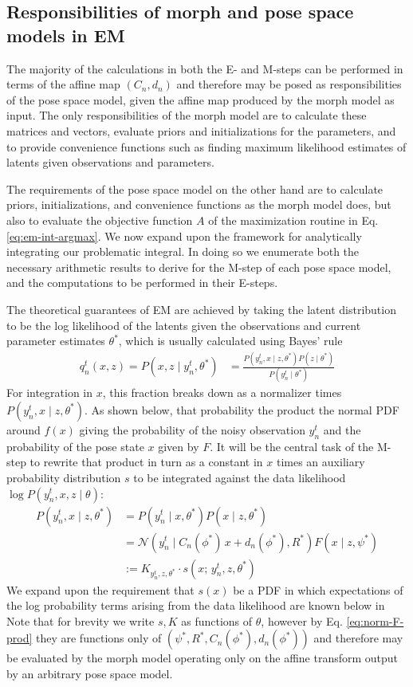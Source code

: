 \documentclass{article}         %
\newcommand{\NN}{\mathcal{N}}
\begin{document}
\subsection{Responsibilities of morph and pose space models in EM}

The majority of the calculations in both the E- and M-steps can be performed in terms of the affine map $(C_n, d_n)$ and therefore may be posed as responsibilities of the pose space model, given the affine map produced by the morph model as input. The only responsibilities of the morph model are to calculate these matrices and vectors, evaluate priors and initializations for the parameters, and to provide convenience functions such as finding maximum likelihood estimates of latents given observations and parameters.

The requirements of the pose space model on the other hand are to calculate priors, initializations, and convenience functions as the morph model does, but also to evaluate the objective function $A$ of the maximization routine in Eq. \ref{eq:em-int-argmax}. We now expand upon the framework for analytically integrating our problematic integral. In doing so we enumerate both the necessary arithmetic results to derive for the M-step of each pose space model, and the computations to be performed in their E-steps.

The theoretical guarantees of EM are achieved by taking the latent distribution to be the log likelihood of the latents given the observations and current parameter estimates $\theta^*$, which is usually calculated using Bayes' rule
\begin{align}
    q_n^t(x, z) = P(x, z \mid y_n^t, \theta^*) &= \frac{P(y_n^t, x \mid z, \theta^*) P(z\mid \theta^*)}{P(y_n^t \mid \theta^*)}
    \label{eq:q-general}
\end{align}
For integration in $x$, this fraction breaks down as a normalizer times $P(y_n^t, x \mid z, \theta^*)$. As shown below, that probability the product the normal PDF around $f(x)$ giving the probability of the noisy observation $y_n^t$ and the probability of the pose state $x$ given by $F$. It will be the central task of the M-step to rewrite that product in turn as a constant in $x$ times an auxiliary probability distribution $s$ to be integrated against the data likelihood $\log P(y_n^t, x, z \mid \theta)$:
\begin{align}
    P(y_n^t, x \mid z, \theta^*) &= P(y_n^t \mid x, \theta^*) P(x\mid z, \theta^*) \\
    &= \NN(y_n^t\mid C_n(\phi^*)\, x + d_n(\phi^*), R^*) F(x\mid z, \psi^*) \label{eq:norm-F-prod} \\
    &:=  K_{y_n^t, z, \theta^*}\cdot s(x;\, y_n^t, z, \theta^*)
    \label{eq:s-defn}
\end{align}
We expand upon the requirement that $s(x)$ be a PDF in which expectations of the log probability terms arising from the data likelihood are known below in %
Note that for brevity we write $s, K$ as functions of $\theta$, however by Eq. \ref{eq:norm-F-prod} they are functions only of $(\psi^*, R^*, C_n(\phi^*), d_n(\phi^*))$ and therefore may be evaluated by the morph model operating only on the affine transform output by an arbitrary pose space model.
\end{document}
